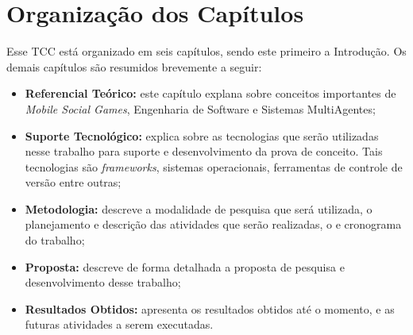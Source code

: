 \section{Organização dos Capítulos}

Esse TCC está organizado em seis capítulos, sendo este primeiro a Introdução. Os demais capítulos são resumidos brevemente a seguir:

  \begin{itemize}
    \item \textbf{Referencial Teórico:} este capítulo explana sobre conceitos importantes de \textit{Mobile Social Games}, Engenharia de Software e Sistemas MultiAgentes;
    \item \textbf{Suporte Tecnológico:} explica sobre as tecnologias que serão utilizadas nesse trabalho para suporte e desenvolvimento da prova de conceito. Tais tecnologias são \textit{frameworks}, sistemas operacionais, ferramentas de controle de versão entre outras;
    \item \textbf{Metodologia:} descreve a modalidade de pesquisa que será utilizada, o planejamento e descrição das atividades que serão realizadas, o e cronograma do trabalho;
    \item \textbf{Proposta:} descreve de forma detalhada a proposta de pesquisa e desenvolvimento desse trabalho;
    \item \textbf{Resultados Obtidos:} apresenta os resultados obtidos até o momento, e as futuras atividades a serem executadas.
  \end{itemize}
